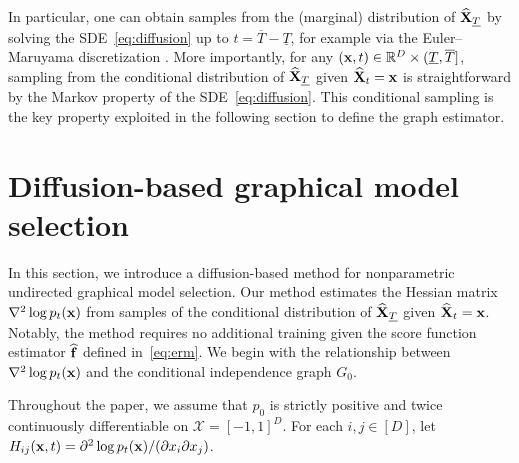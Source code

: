 \documentclass[11pt,a4paper,final]{article}
\numberwithin{equation}{section}
\theoremstyle{remark}
\def\cX{\mathcal X}
\newcommand{\bff}{{\bf f}}
\newcommand{\bx}{{\bf x}}
\newcommand{\bX}{{\bf X}}
\newcommand{\bbR}{{\mathbb R}}
\begin{document}
In particular, one can obtain samples from the (marginal) distribution of $\widehat \bX_{\underline{T}}$ by solving the SDE~\eqref{eq:diffusion} up to $t = \overline{T} - \underline{T}$, for example via the Euler--Maruyama discretization \citep{kloeden2011numerical, song2021scorebased}.
More importantly, for any $(\bx,t) \in \bbR^{D} \times (\underline{T}, \overline{T}]$, sampling from the conditional distribution of $\widehat \bX_{\underline{T}}$ given $\widehat \bX_{t} = \bx$ is straightforward by the Markov property of the SDE~\eqref{eq:diffusion}. This conditional sampling is the key property exploited in the following section to define the graph estimator.





\section{Diffusion-based graphical model selection} \label{sec:method}

In this section, we introduce a diffusion-based method for nonparametric undirected graphical model selection.
Our method estimates the Hessian matrix $\nabla^2 \log p_t(\bx)$ from samples of the conditional distribution of $\widehat \bX_{\underline{T}}$ given $\widehat \bX_{t} = \bx$.
Notably, the method requires no additional training given the score function estimator $\widehat \bff$ defined in~\eqref{eq:erm}.
We begin with the relationship between $\nabla^2 \log p_t(\bx)$ and the conditional independence graph $G_{0}$.

Throughout the paper, we assume that $p_{0}$ is strictly positive and twice continuously differentiable on $\cX = [-1,1]^{D}$.
For each $i,j \in [D]$, let $H_{ij}(\bx,t) = \partial^2 \log p_t (\bx) / (\partial x_i \partial x_j)$.
\end{document}

